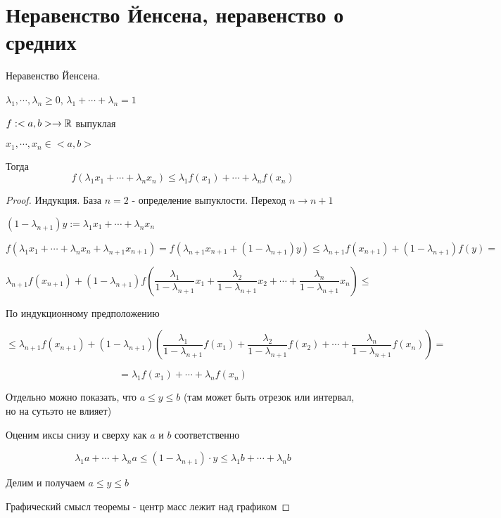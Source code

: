 \section{Неравенство Йенсена, неравенство о средних}

\begin{theorem}
    Неравенство Йенсена.
    
    $\lambda_1, \cdots, \lambda_n \geq 0$, 
    $\lambda_1+\cdots+\lambda_n = 1$

    $f: <a, b> \to \mathbb{R}$ выпуклая

    $x_1,\cdots, x_n \in <a, b>$

    Тогда \[f(\lambda_1x_1+\cdots+\lambda_nx_n)\leq \lambda_1f(x_1)+
    \cdots+\lambda_nf(x_n) \]
\end{theorem}

\begin{proof}
    Индукция. База $n = 2$ - определение выпуклости. Переход $n \to n+1$

    $ (1-\lambda_{n+1}) y:= \lambda_1x_1+\cdots+\lambda_n x_n$

    \[ f(\lambda_1x_1+\cdots+\lambda_n x_n + \lambda_{n+1}x_{n+1}) = f(\lambda_{n+1}x_{n+1} + (1-\lambda_{n+1})y)
    \leq \lambda_{n+1}f(x_{n+1}) + (1-\lambda_{n+1})f(y) = \]

    \[ \lambda_{n+1}f(x_{n+1}) + (1-\lambda_{n+1}) f \left( \frac{\lambda_1}{1-\lambda_{n+1}}x_1 + \frac{\lambda_2}{1-\lambda_{n+1}}x_2+
    \cdots + \frac{\lambda_n}{1-\lambda_{n+1}}x_n \right) \leq \]

    По индукционному предположению

    \[ \leq \lambda_{n+1}f(x_{n+1}) + (1-\lambda_{n+1}) \left( \frac{\lambda_1}{1-\lambda_{n+1}}f(x_1) + \frac{\lambda_2}{1-\lambda_{n+1}}f(x_2)+
    \cdots + \frac{\lambda_n}{1-\lambda_{n+1}}f(x_n) \right) = \]

    \[ = \lambda_1f(x_1)+ \cdots+\lambda_nf(x_n) \]

    Отдельно можно показать, что $a \leq y \leq b$ (там может быть отрезок или интервал, но на сутьэто не влияет)

    Оценим иксы снизу и сверху как $a$ и $b$ соответственно

    \[ \lambda_1 a+\cdots+\lambda_n a \leq (1-\lambda_{n+1})\cdot y \leq \lambda_1 b+\cdots+\lambda_n b \]

    Делим и получаем $a \leq y \leq b$

    Графический смысл теоремы - центр масс лежит над графиком
    
\end{proof}


